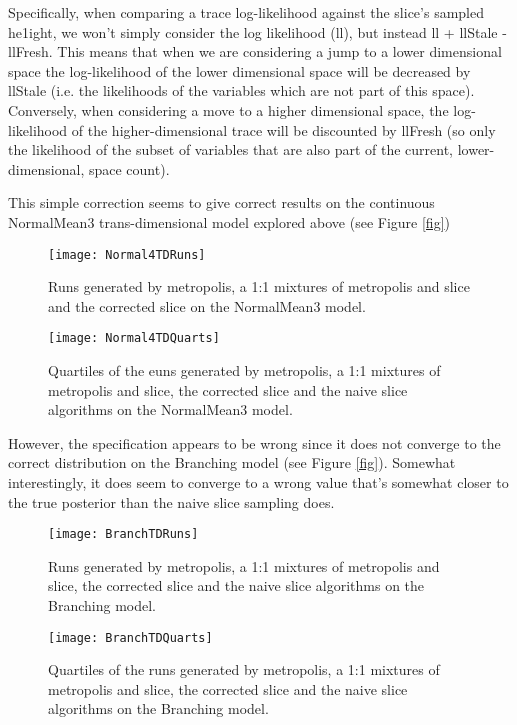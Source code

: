 Specifically, when comparing a trace log-likelihood against the slice's sampled he1ight, we won't simply consider the log likelihood (ll), but instead ll + llStale - llFresh.
This means that when we are considering a jump to a lower dimensional space the log-likelihood of the lower dimensional space will be decreased by llStale (i.e. the likelihoods of the variables which are not part of this space). Conversely, when considering a move to a higher dimensional space, the log-likelihood of the higher-dimensional trace will be discounted by llFresh (so only the likelihood of the subset of variables that are also part of the current, lower-dimensional, space count).

This simple correction seems to give correct results on the continuous NormalMean3 trans-dimensional model explored above (see Figure \ref{fig})

\begin{figure}[H]
    \centering
    \texttt{[image: Normal4TDRuns]}
    \caption{Runs generated by metropolis, a 1:1 mixtures of metropolis and slice and the corrected slice on the NormalMean3 model.}
    \label{fig:Normal4TDRuns}
\end{figure}

\begin{figure}[H]
    \centering
    \texttt{[image: Normal4TDQuarts]}
    \caption{Quartiles of the euns generated by metropolis, a 1:1 mixtures of metropolis and slice, the corrected slice and the naive slice algorithms on the NormalMean3 model.}
    \label{fig:Normal4TDQuarts}
\end{figure}


However, the specification appears to be wrong since it does not converge to the correct distribution on the Branching model (see Figure \ref{fig}). Somewhat interestingly, it does seem to converge to a wrong value that's somewhat closer to the true posterior than the naive slice sampling does.

\begin{figure}[H]
    \centering
    \texttt{[image: BranchTDRuns]}
    \caption{Runs generated by metropolis, a 1:1 mixtures of metropolis and slice, the corrected slice and the naive slice algorithms on the Branching model.}
    \label{fig:BranchTDRuns}
\end{figure}

\begin{figure}[H]
    \centering
    \texttt{[image: BranchTDQuarts]}
    \caption{Quartiles of the runs generated by metropolis, a 1:1 mixtures of metropolis and slice, the corrected slice and the naive slice algorithms on the Branching model.}
    \label{fig:BranchTDQuarts}
\end{figure}


